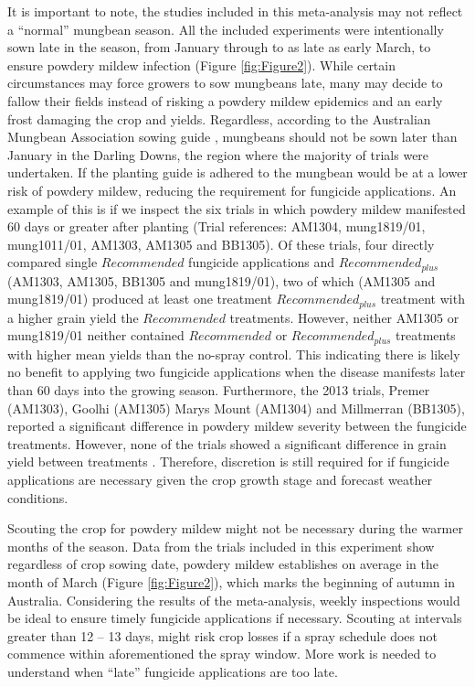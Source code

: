 \documentclass[agronomy,article,submit,moreauthors,pdftex]{mdpi}
\begin{document}
It is important to note, the studies included in this meta-analysis may not reflect a ``normal'' mungbean season.
All the included experiments were intentionally sown late in the season, from January through to as late as early March, to ensure powdery mildew infection (Figure \ref{fig:Figure2}).
While certain circumstances may force growers to sow mungbeans late, many may decide to fallow their fields instead of risking a powdery mildew epidemics and an early frost damaging the crop and yields.
Regardless, according to the Australian Mungbean Association sowing guide \citep{AMAplanting}, mungbeans should not be sown later than January in the Darling Downs, the region where the majority of trials were undertaken.
If the planting guide is adhered to the mungbean would be at a lower risk of powdery mildew, reducing the requirement for fungicide applications.
An example of this is if we inspect the six trials in which powdery mildew manifested 60 days or greater after planting (Trial references: AM1304, mung1819/01, mung1011/01, AM1303, AM1305 and BB1305).
Of these trials, four directly compared single \(Recommended\) fungicide applications and \(Recommended_{plus}\) (AM1303, AM1305, BB1305 and mung1819/01), two of which (AM1305 and mung1819/01) produced at least one treatment \(Recommended_{plus}\) treatment with a higher grain yield the \(Recommended\) treatments.
However, neither AM1305 or mung1819/01 neither contained \(Recommended\) or \(Recommended_{plus}\) treatments with higher mean yields than the no-spray control.
This indicating there is likely no benefit to applying two fungicide applications when the disease manifests later than 60 days into the growing season.
Furthermore, the 2013 trials, Premer (AM1303), Goolhi (AM1305) Marys Mount (AM1304) and Millmerran (BB1305), reported a significant difference in powdery mildew severity between the fungicide treatments.
However, none of the trials showed a significant difference in grain yield between treatments \citep[\citet{premer2013}, \citet{Marysmount2013}, \citet{goolhi2013}]{Millmerran2013}.
Therefore, discretion is still required for if fungicide applications are necessary given the crop growth stage and forecast weather conditions.

Scouting the crop for powdery mildew might not be necessary during the warmer months of the season.
Data from the trials included in this experiment show regardless of crop sowing date, powdery mildew establishes on average in the month of March (Figure \ref{fig:Figure2}), which marks the beginning of autumn in Australia.
Considering the results of the meta-analysis, weekly inspections would be ideal to ensure timely fungicide applications if necessary.
Scouting at intervals greater than 12 -- 13 days, might risk crop losses if a spray schedule does not commence within aforementioned the spray window.
More work is needed to understand when ``late'' fungicide applications are too late.
\end{document}
